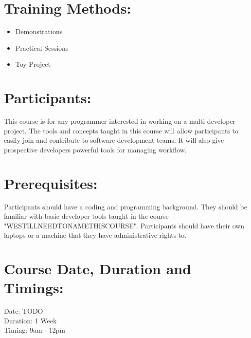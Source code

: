 \documentclass[a4paper,11pt]{article}
\begin{document}
\section{Training Methods:}
\begin{itemize}
	\item Demonstrations
	\item Practical Sessions
	\item Toy Project
\end{itemize}

\section{Participants:}
This course is for any programmer interested in working on a multi-developer project. The tools and concepts taught in this course will allow participants to easily join and contribute to software development teams. It will also give prospective developers powerful tools for managing workflow.

\section{Prerequisites:}
Participants should have a coding and programming background. They should be familiar with basic developer tools taught in the course "WESTILLNEEDTONAMETHISCOURSE". Participants should have their own laptops or a machine that they have administrative rights to.

\section{Course Date, Duration and Timings:}
Date: TODO\\
Duration: 1 Week\\
Timing: 9am - 12pm
\end{document}
